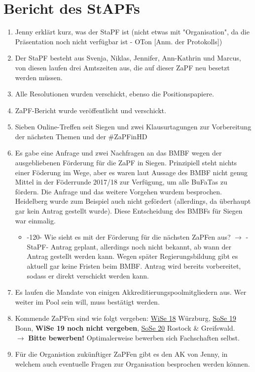 \section{Bericht des StAPFs}
  \begin{enumerate}
    \item Jenny erklärt kurz, was der StaPF ist (nicht etwas mit "Organisation", da die Präsentation noch nicht verfügbar ist - OTon [Anm. der Protokolls])
    \item Der StaPF besteht aus Svenja, Niklas, Jennifer, Ann-Kathrin und Marcus, von diesen laufen drei Amtszeiten aus, die auf dieser ZaPF neu besetzt werden müssen.
    \item Alle Resolutionen wurden verschickt, ebenso die Positionspapiere.
    \item ZaPF-Bericht wurde veröffentlicht und verschickt.
    \item Sieben Online-Treffen seit Siegen und zwei Klausurtagungen zur Vorbereitung der nächsten Themen und der \#ZaPFinHD
    \item Es gabe eine Anfrage und zwei Nachfragen an das BMBF wegen der ausgebliebenen Förderung für die ZaPF in Siegen. Prinzipiell steht nichts einer Föderung im Wege,
      aber es waren laut Aussage des BMBF nicht genug Mittel in der Föderrunde 2017/18 zur Verfügung, um alle BuFaTas zu fördern. Die Anfrage und das weitere Vorgehen wurdem besprochen.
      Heidelberg wurde zum Beispiel auch nicht gefördert (allerdings, da überhaupt gar kein Antrag gestellt wurde). Diese Entscheidung des BMBFs für Siegen war einmalig.
      \begin{itemize}
        \item -120- Wie sieht es mit der Förderung für die nächsten ZaPFen aus? $\rightarrow$ -StaPF- Antrag geplant, allerdings noch nicht bekannt, ab wann der Antrag gestellt werden kann. Wegen später Regierungsbildung gibt es aktuell gar keine Fristen beim BMBF. Antrag wird bereits vorbereitet, sodass er direkt verschickt werden kann.
      \end{itemize}
    \item Es laufen die Mandate von einigen Akkreditierungspoolmitgliedern aus. Wer weiter im Pool sein will, muss bestätigt werden.
    \item Kommende ZaPFen sind wie folgt vergeben: \underline{WiSe 18} Würzburg, \underline{SoSe 19} Bonn, \textbf{WiSe 19 noch nicht vergeben}, \underline{SoSe 20} Rostock \& Greifswald. \\ $\rightarrow$ \textbf{Bitte bewerben!} Optimalerweise bewerben sich Fachschaften selbst.
    \item Für die Organistion zukünftiger ZaPFen gibt es den AK von Jenny, in welchem auch eventuelle Fragen zur Organisation besprochen werden können.
  \end{enumerate}

